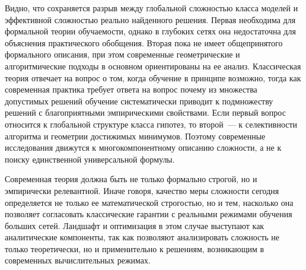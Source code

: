 \documentclass[russian]{intsys}
\begin{document}
Видно, что сохраняется разрыв между глобальной сложностью класса моделей и эффективной сложностью реально найденного решения.
Первая необходима для формальной теории обучаемости, однако в глубоких сетях она недостаточна для объяснения практического обобщения.
Вторая пока не имеет общепринятого формального описания, при этом современные геометрические и алгоритмические подходы в основном ориентированы на ее анализ.
Классическая теория отвечает на вопрос о том, когда обучение в принципе возможно, тогда как современная практика требует ответа на вопрос почему из множества допустимых решений обучение систематически приводит к подмножеству решений с благоприятными эмпирическими свойствами.
Если первый вопрос относится к глобальной структуре класса гипотез, то второй~--- к селективности алгоритма и геометрии достижимых минимумов.
Поэтому современные исследования движутся к многокомпонентному описанию сложности, а не к поиску единственной универсальной формулы.

Современная теория должна быть не только формально строгой, но и эмпирически релевантной.
Иначе говоря, качество меры сложности сегодня определяется не только ее математической строгостью, но и тем, насколько она позволяет согласовать классические гарантии с реальными режимами обучения больших сетей.
Ландшафт и оптимизация в этом случае выступают как аналитические компоненты, так как позволяют анализировать сложность не только теоретически, но и применительно к решениям, возникающим в современных вычислительных режимах.
\end{document}
